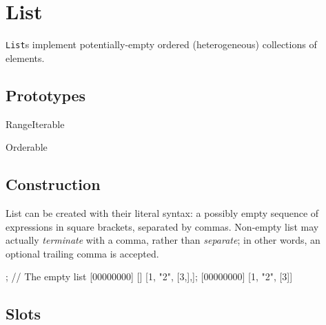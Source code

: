 
\section{List}

\lstinline|List|s implement potentially-empty ordered (heterogeneous)
collections of elements.

\subsection{Prototypes}

\begin{refObjects}
\item[RangeIterable]
\item[Orderable]
\end{refObjects}

\subsection{Construction}

List can be created with their literal syntax: a possibly empty
sequence of expressions in square brackets, separated by commas.
Non-empty list may actually \emph{terminate} with a comma, rather than
\emph{separate}; in other words, an optional trailing comma is accepted.

\begin{urbiscript}[firstnumber=1]
[]; // The empty list
[00000000] []
[1, "2", [3,],];
[00000000] [1, "2", [3]]
\end{urbiscript}

\subsection{Slots}

